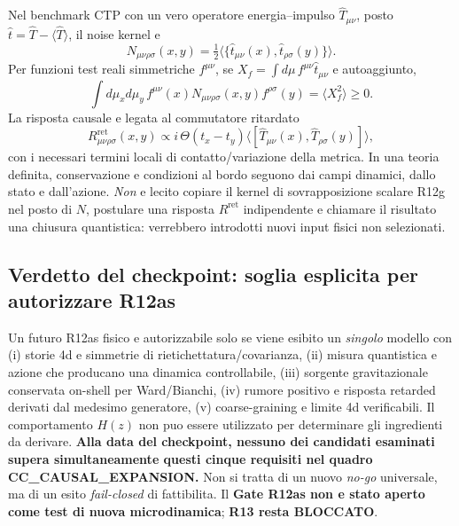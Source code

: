 \documentclass[11pt,a4paper]{article}
\begin{document}
Nel benchmark CTP con un vero operatore energia--impulso $\hat T_{\mu\nu}$,
posto $\hat t=\hat T-\langle\hat T\rangle$, il noise kernel e
\begin{equation}
N_{\mu\nu\rho\sigma}(x,y)=\tfrac12
\big\langle\{\hat t_{\mu\nu}(x),\hat t_{\rho\sigma}(y)\}\big\rangle.
\end{equation}
Per funzioni test reali simmetriche $f^{\mu\nu}$, se
$X_f=\int d\mu\,f^{\mu\nu}\hat t_{\mu\nu}$ e autoaggiunto,
\begin{equation}
\int d\mu_x d\mu_y\,f^{\mu\nu}(x)
N_{\mu\nu\rho\sigma}(x,y)f^{\rho\sigma}(y)
=\langle X_f^2\rangle\ge0.
\end{equation}
La risposta causale e legata al commutatore ritardato
\begin{equation}
R^{\mathrm{ret}}_{\mu\nu\rho\sigma}(x,y)
\propto i\,\Theta(t_x-t_y)
\langle[\hat T_{\mu\nu}(x),\hat T_{\rho\sigma}(y)]\rangle,
\end{equation}
con i necessari termini locali di contatto/variazione della metrica.
In una teoria definita, conservazione e condizioni al bordo seguono dai
campi dinamici, dallo stato e dall'azione. \emph{Non} e lecito copiare il
kernel di sovrapposizione scalare R12g nel posto di $N$, postulare una
risposta $R^{\mathrm{ret}}$ indipendente e chiamare il risultato una chiusura
quantistica: verrebbero introdotti nuovi input fisici non selezionati.

\subsection{Verdetto del checkpoint: soglia esplicita per autorizzare R12as}

Un futuro R12as fisico e autorizzabile solo se viene esibito un \emph{singolo}
modello con (i) storie 4d e simmetrie di rietichettatura/covarianza,
(ii) misura quantistica e azione che producano una dinamica controllabile,
(iii) sorgente gravitazionale conservata on-shell per Ward/Bianchi,
(iv) rumore positivo e risposta retarded derivati dal medesimo generatore,
(v) coarse-graining e limite 4d verificabili. Il comportamento $H(z)$ non
puo essere utilizzato per determinare gli ingredienti da derivare.
\textbf{Alla data del checkpoint, nessuno dei candidati esaminati supera
simultaneamente questi cinque requisiti nel quadro CC\_CAUSAL\_EXPANSION.}
Non si tratta di un nuovo \emph{no-go} universale, ma di un esito
\emph{fail-closed} di fattibilita. Il \textbf{Gate R12as non e stato aperto come
test di nuova microdinamica}; \textbf{R13 resta BLOCCATO}.
\end{document}
